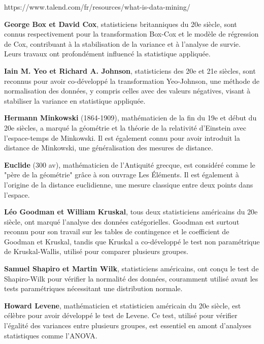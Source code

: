 \adjustmtc
\newpage
\renewcommand\bibname{Biographie}
\begin{thebibliography}{9}
\thispagestyle{MyStyle}

https://www.talend.com/fr/resources/what-is-data-mining/

\textbf{George Box et David Cox}, statisticiens britanniques du 20e siècle, sont connus respectivement pour la transformation Box-Cox et le modèle de régression de Cox, contribuant à la stabilisation de la variance et à l'analyse de survie. Leurs travaux ont profondément influencé la statistique appliquée.

\textbf{Iain M. Yeo et Richard A. Johnson}, statisticiens des 20e et 21e siècles, sont reconnus pour avoir co-développé la transformation Yeo-Johnson, une méthode de normalisation des données, y compris celles avec des valeurs négatives, visant à stabiliser la variance en statistique appliquée.

\textbf{Hermann Minkowski} (1864-1909), mathématicien de la fin du 19e et début du 20e siècles, a marqué la géométrie et la théorie de la relativité d'Einstein avec l'espace-temps de Minkowski. Il est également connu pour avoir introduit la distance de Minkowski, une généralisation des mesures de distance.

\textbf{Euclide} (300 av), mathématicien de l'Antiquité grecque, est considéré comme le "père de la géométrie" grâce à son ouvrage Les Éléments. Il est également à l'origine de la distance euclidienne, une mesure classique entre deux points dans l'espace.

\textbf{Léo Goodman et William Kruskal}, tous deux statisticiens américains du 20e siècle, ont marqué l'analyse des données catégorielles. Goodman est surtout reconnu pour son travail sur les tables de contingence et le coefficient de Goodman et Kruskal, tandis que Kruskal a co-développé le test non paramétrique de Kruskal-Wallis, utilisé pour comparer plusieurs groupes.

\textbf{Samuel Shapiro et Martin Wilk}, statisticiens américains, ont conçu le test de Shapiro-Wilk pour vérifier la normalité des données, couramment utilisé avant les tests paramétriques nécessitant une distribution normale.

\textbf{Howard Levene}, mathématicien et statisticien américain du 20e siècle, est célèbre pour avoir développé le test de Levene. Ce test, utilisé pour vérifier l'égalité des variances entre plusieurs groupes, est essentiel en amont d'analyses statistiques comme l'ANOVA.


\end{thebibliography}
